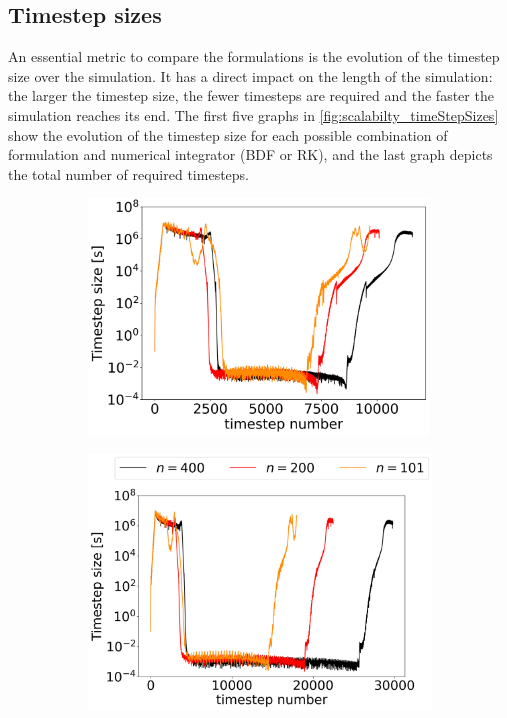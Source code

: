 \subsection{Timestep sizes}
\label{ssec:Results_scalability_timestepSizes}
An essential metric to compare the formulations is the evolution of the timestep size over the simulation. It has a direct impact on the length of the simulation: the larger the timestep size, the fewer timesteps are required and the faster the simulation reaches its end. The first five graphs in \autoref{fig:scalabilty_timeStepSizes} show the evolution of the timestep size for each possible combination of formulation and numerical integrator (BDF or RK), and the last graph depicts the total number of required timesteps.

\begin{figure}[H]
	\centering
	\begin{subfigure}[b]{0.32\textwidth}
		\centering
		\includegraphics[width=0.99\textwidth]{images/TANDEM_DT_differentSizes_BDFcompactODE.png}
	\end{subfigure}
	\begin{subfigure}[b]{0.32\textwidth}
		\centering
		\includegraphics[width=1.04\textwidth]{images/TANDEM_DT_differentSizes_BDFextendedODE.png}

\end{subfigure}
\end{figure}
